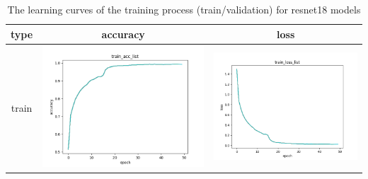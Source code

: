 \documentclass[a4paper, 12pt]{article}
\begin{document}
\begin{table}[!htb]
  \centering
  \caption{The learning curves of the training process (train/validation) for resnet18 models}
  \begin{tabular}{|c|c|c|}
    \hline
    type  & accuracy                                                                                                  & loss                                                                                                       \\
    \hline
    train & \includegraphics[scale=0.5]{p2/experiment/resnet18_2024_04_12_14_05_14_sgd_pre_da/log/train_acc_list.png} & \includegraphics[scale=0.5]{p2/experiment/resnet18_2024_04_12_14_05_14_sgd_pre_da/log/train_loss_list.png} \\

\end{tabular}
\end{table}
\end{document}
